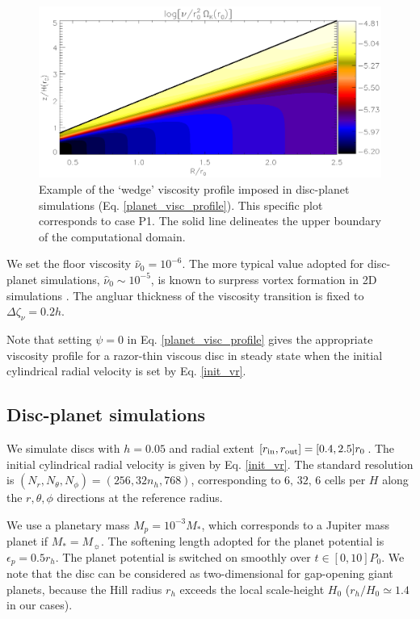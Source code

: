 \begin{figure}
  \centering
  \includegraphics[width=\linewidth]{figures/pdisk_visc2d_planet}
  \caption{Example of the `wedge' viscosity profile
    imposed in disc-planet simulations (Eq. \ref{planet_visc_profile}). This specific plot
    corresponds to case P1. The solid line
    delineates the upper boundary of the computational domain.
    \label{planet_visc2d}}
\end{figure}

We set the floor viscosity $\hat{\nu}_0=10^{-6}$. The more typical
value adopted for disc-planet simulations, $\hat{\nu}_0\sim 10^{-5}$,
is known to surpress vortex formation in 2D simulations
\citep{valborro07, mudryk09}. The angluar thickness of the viscosity
transition is fixed to $\Delta\zeta_\nu = 0.2h$.   

Note that setting $\psi = 0$ in Eq. \ref{planet_visc_profile} gives
the appropriate viscosity profile for a razor-thin viscous disc in
steady state when the initial cylindrical radial velocity 
is set by Eq. \ref{init_vr}. 

\subsection{Disc-planet simulations} 
We simulate discs with $h=0.05$ and radial extent
$[r_\mathrm{in},r_\mathrm{out}]=[0.4,2.5]r_0$. The initial cylindrical radial velocity
is given by Eq. \ref{init_vr}. The standard resolution is $(N_r,
N_\theta, N_\phi)=(256, 32n_h, 768)$, corresponding to $6,\,32,\,6$
cells per $H$ along the $r,\theta,\phi$ directions 
at the reference radius. 

We use a planetary mass 
$M_p=10^{-3}M_*$, which corresponds to a Jupiter mass planet if
$M_*=M_{\sun}$. The softening length adopted for the planet potential is
$\epsilon_p=0.5r_h$. The planet potential is switched on 
smoothly over $t\in[0,10]P_0$. We note that the disc can be considered
as two-dimensional for gap-opening giant planets, because the Hill
radius $r_h$ exceeds the local scale-height $H_0$ ($r_h/H_0\simeq1.4$
in our cases).   

